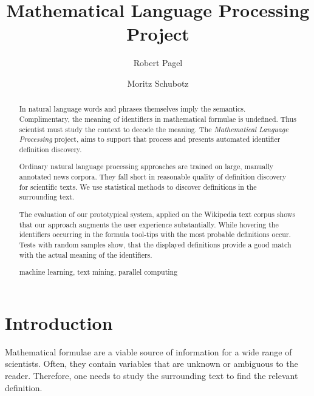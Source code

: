 \documentclass[runningheads]{llncs}
\newcommand{\keywords}[1]{\par\addvspace\baselineskip
\noindent\keywordname\enspace\ignorespaces#1}
\begin{document}
\mainmatter

\title{Mathematical Language Processing \\ Project}

\author{Robert Pagel \and Moritz Schubotz}



\maketitle


\begin{abstract}
In natural language words and phrases themselves imply the semantics.
Complimentary, the meaning of identifiers in mathematical formulae is undefined.
Thus scientist must study the context to decode the meaning.
The \emph{Mathematical Language Processing} project, aims to support that process and
presents automated identifier definition discovery.

Ordinary natural language processing approaches are trained on large, manually annotated news
corpora. They fall short in reasonable quality of definition discovery for scientific texts.
We use statistical methods to discover definitions in the surrounding text.

The evaluation of our prototypical system, applied on the Wikipedia text
corpus shows that our approach augments the user experience
substantially. While hovering the identifiers occurring
in the formula tool-tips with the most probable definitions
occur.
Tests with random samples show, that the displayed definitions provide
a good match with the actual meaning of the identifiers.   
\keywords{machine learning, text mining, parallel computing}
\end{abstract}


\section{Introduction}

Mathematical formulae are a viable source of information for a wide range of
scientists. Often, they contain variables that are unknown or ambiguous to the reader.
Therefore, one needs to study the surrounding text to find the relevant definition.
\end{document}
